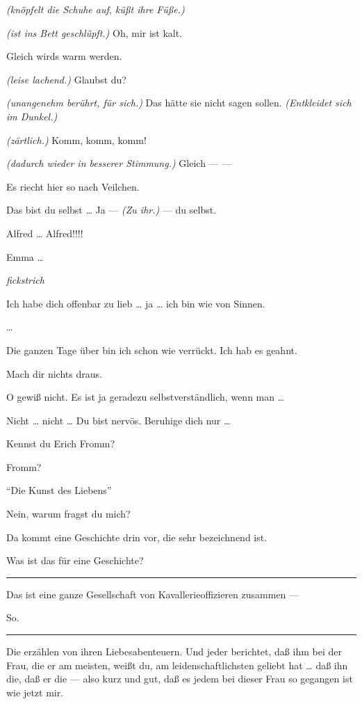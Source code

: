 \documentclass[
	final,
	a4paper,
	ngerman,
	mpinclude = true, %
	twoside = true,
	open = right,
	cleardoublepage = plain,
	DIV = 13,
	BCOR = 1cm,
	titlepage = firstiscover,
	]{scrbook}
\newcommand{\marginnote}[1]{\marginpar{\singlespacing\raggedright\footnotesize#1}}
\newcommand{\direction}[1]{\textit{(#1)}}
\newcommand{\hiat}{%
	\begin{center}
		\tiny
		\raisebox{0.5ex}{\rule{0.3\linewidth}{0.4pt}}
		\textit{fickstrich}
		\raisebox{0.5ex}{\rule{0.3\linewidth}{0.4pt}}
	\end{center}
}
\newenvironment{deletion}{%
		\vspace{0.25\baselineskip}
		\hrule
		\vspace{0.25\baselineskip}
		\color{darkgray}
	}{
		\color{black}
		\vspace{0.25\baselineskip}
		\hrule 
		\vspace{0.25\baselineskip}
	}
\newcommand{\thecharacter}[1]{\textup{\textsc{#1}}\xspace}
\newcommand{\theherr}{\thecharacter{Benjamin}}
\newcommand{\thefrau}{\thecharacter{Emma}}
\newcommand{\character}[1]{\item[#1:]}
\newcommand{\herr}{\character{\theherr}}
\newcommand{\frau}{\character{\thefrau}}
\begin{document}
\begin{play}
	\herr
	\direction{knöpfelt die Schuhe auf, küßt ihre Füße.}

	\frau
	\direction{ist ins Bett geschlüpft.} Oh, mir ist kalt.

	\herr
	Gleich wirds warm werden.

	\frau
	\direction{leise lachend.} Glaubst du?

	\herr
	\direction{unangenehm berührt, für sich.} Das hätte sie nicht sagen sollen. \direction{Entkleidet sich im Dunkel.}

	\frau
	\direction{zärtlich.} Komm, komm, komm!

	\herr
	\direction{dadurch wieder in besserer Stimmung.} Gleich --- ---

	\frau
	Es riecht hier so nach Veilchen.

	\herr
	Das bist du selbst \ldots{} Ja --- \direction{Zu ihr.} --- du selbst.

	\frau
	Alfred \ldots{} Alfred!!!!

	\herr
	Emma \ldots{}

	\marginnote{Er bekommt keinen hoch.}
	\hiat

	\herr
	Ich habe dich offenbar zu lieb \ldots{} ja \ldots{} ich bin wie von Sinnen.

	\frau
	\ldots{}

	\herr
	Die ganzen Tage über bin ich schon wie verrückt. Ich hab es geahnt.

	\frau
	Mach dir nichts draus.

	\herr
	O gewiß nicht. Es ist ja geradezu selbstverständlich, wenn man \ldots{}

	\frau
	Nicht \ldots{} nicht \ldots{} Du bist nervös. Beruhige dich nur \ldots{}

	\herr
	Kennst du Erich Fromm?

	\frau
	Fromm?

	\herr
	\enquote{Die Kunst des Liebens}

	\frau
	Nein, warum fragst du mich?

	\herr
	Da kommt eine Geschichte drin vor, die sehr bezeichnend ist.

	\frau
	Was ist das für eine Geschichte?

	\begin{deletion}
	\herr
	Das ist eine ganze Gesellschaft von Kavallerieoffizieren zusammen ---

	\frau
	So.
	\end{deletion}

	\herr
	Die erzählen von ihren Liebesabenteuern. Und jeder berichtet, daß ihm bei der Frau, die er am meisten, weißt du, am leidenschaftlichsten geliebt hat \ldots{} daß ihn die, daß er die --- also kurz und gut, daß es jedem bei dieser Frau so gegangen ist wie jetzt mir.


\end{play}
\end{document}
